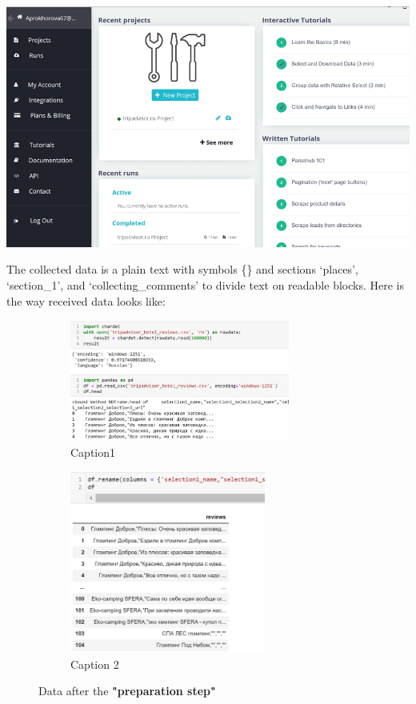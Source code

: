 \documentclass{article}
\begin{document}
\begin{center}
\includegraphics[width=1\linewidth]{images/figure 1.jpg}
\end{center}
\newline\newline
The collected data is a plain text with symbols \{\} and sections ‘places’, ‘section\_1’, and ‘collecting\_comments’ to divide text on readable blocks.
\newline\newline
Here is the way received data looks like:

\begin{figure}
\begin{subfigure}{0.5\textwidth}
\includegraphics[width=1\linewidth, height=4cm]{images/figure 2.jpg} 
\caption{Caption1}
\label{fig:subim1}
\end{subfigure}
\begin{subfigure}{0.5\textwidth}
\includegraphics[width=1\linewidth, height=6cm]{images/figure 3.jpg}
\caption{Caption 2}
\label{fig:subim2}
\end{subfigure}
\caption{Data after the \textbf{"preparation step" }}
\end{figure}
\end{document}
